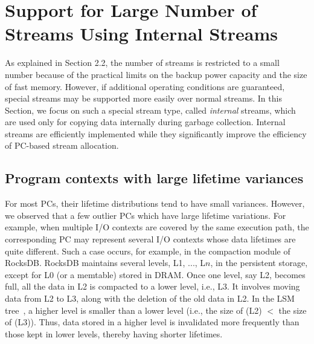 \section{Support for Large Number of Streams Using Internal Streams}
{\color{blue}
As explained in Section 2.2, the number of streams is restricted to a small number 
because of the practical limits on the backup power capacity and the size of fast memory.  
However, if additional operating conditions are guaranteed, special streams may be 
supported more easily over normal streams.  
In this Section, we focus on such  a special stream type, called {\it internal} streams, which
are used only for copying data internally during garbage collection.  
Internal streams are efficiently implemented while they significantly 
improve the efficiency of PC-based stream allocation.
}

\subsection{Program contexts with large lifetime variances}
For most PCs, their lifetime distributions tend to have small variances.  
However, we observed that a few outlier PCs which have large lifetime variations. 
For example, when multiple I/O contexts are covered by the same execution path, 
the corresponding PC may represent several I/O contexts whose data lifetimes are quite different.   
Such a case occurs, for example, 
in the compaction module of RocksDB.
RocksDB maintains
several levels, L1, ..., L$n$, in the persistent storage, except for L0 (or a
memtable) stored in DRAM.  Once one level, say L2, becomes full, all the data
in L2 is compacted to a lower level, i.e., L3.  It involves moving data from L2
to L3, along with the deletion of the old data in L2.  In the
LSM tree~\cite{LSM}, a higher level is smaller than a lower level 
(i.e., the size of (L2) $<$ the size of (L3)). 
Thus, data stored in a higher level is invalidated more frequently than those kept
in lower levels, thereby having shorter lifetimes.


